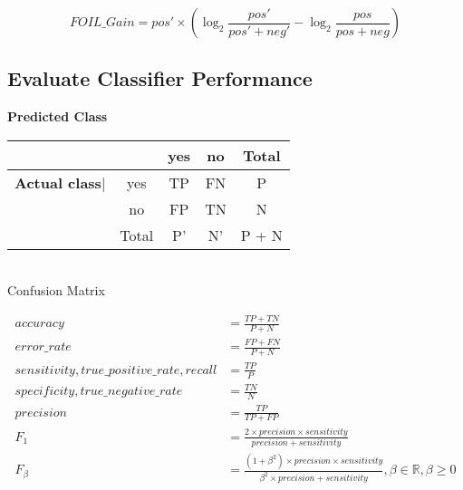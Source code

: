 \documentclass{article}
\begin{document}
                \begin{equation*}
                    FOIL\_Gain = pos'\times \left(\log_2\frac{pos'}{pos'+neg'} - \log_2\frac{pos}{pos+neg} \right)
                \end{equation*}




            \newpage
            \subsection{Evaluate Classifier Performance}
                \begin{center}
                    \textbf{Predicted Class} \\
                    \begin{tabular}{|r|c|c|c|c|}
                        \hline
                        & & yes & no & Total \\
                        \hline
                        \textbf{Actual class}| & yes & TP & FN & P \\
                        \hline
                        & no & FP & TN & N \\
                        \hline
                        & Total & P' & N' & P + N \\
                        \hline

                    \end{tabular}
                    \\ Confusion Matrix
                \end{center}

                \begin{align*}
                    accuracy &= \frac{TP + TN}{P + N}\\
                    error\_rate &= \frac{FP + FN}{P + N}\\
                    sensitivity, true\_positive\_rate, recall &= \frac{TP}{P}\\
                    specificity, true\_negative\_rate &= \frac{TN}{N}\\
                    precision &= \frac{TP}{TP + FP}\\
                    F_1 &= \frac{2\times precision \times sensitivity}{precision + sensitivity}\\
                    F_\beta &= \frac{(1 + \beta^2)\times precision\times sensitivity}{\beta^2\times precision + sensitivity}, \beta \in \mathbb{R}, \beta \geq 0\\
                \end{align*}
\end{document}
